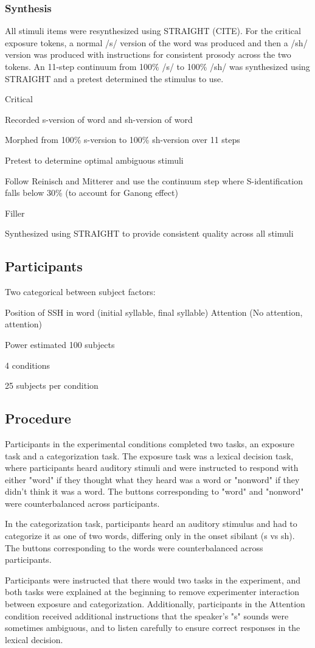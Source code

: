 \subsubsection{Synthesis}

All stimuli items were resynthesized using STRAIGHT (CITE).  For the critical exposure tokens, a normal /s/ version of the word was produced and then a /sh/ version was produced with instructions for consistent prosody across the two tokens.  An 11-step continuum from 100\% /s/ to 100\% /sh/ was synthesized using STRAIGHT and a pretest determined the stimulus to use.

Critical

	Recorded s-version of word and sh-version of word

	Morphed from 100\% s-version to 100\% sh-version over 11 steps

	Pretest to determine optimal ambiguous stimuli

	Follow Reinisch and Mitterer and use the continuum step where S-identification falls below 30\% (to account for Ganong effect)

Filler

	Synthesized using STRAIGHT to provide consistent quality across all stimuli

\subsection{Participants}

Two categorical between subject factors:

	Position of SSH in word (initial syllable, final syllable)
	Attention (No attention, attention)

Power estimated 100 subjects

4 conditions

25 subjects per condition

\subsection{Procedure}

Participants in the experimental conditions completed two tasks, an exposure task and a categorization task.  The exposure task was a lexical decision task, where participants heard auditory stimuli and were instructed to respond with either "word" if they thought what they heard was a word or "nonword" if they didn't think it was a word.  The buttons corresponding to "word" and "nonword" were counterbalanced across participants.

In the categorization task, participants heard an auditory stimulus and had to categorize it as one of two words, differing only in the onset sibilant (s vs sh).  The buttons corresponding to the words were counterbalanced across participants.

Participants were instructed that there would two tasks in the experiment, and both tasks were explained at the beginning to remove experimenter interaction between exposure and categorization.  Additionally, participants in the Attention condition received additional instructions that the speaker's "s" sounds were sometimes ambiguous, and to listen carefully to ensure correct responses in the lexical decision.

